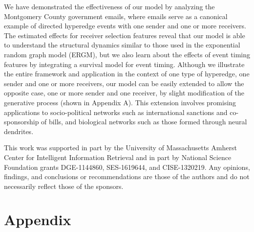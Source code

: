 \documentclass[ba]{imsart}
\numberwithin{equation}{section}
\theoremstyle{plain}
\begin{document}
	We have demonstrated the effectiveness of our model by analyzing the Montgomery County government emails, where emails serve as a canonical example of directed hyperedge events with one sender and one or more receivers. The estimated effects for receiver selection features reveal that our model is able to understand the structural dynamics similar to those used in the exponential random graph model (ERGM), but we also learn about the effects of event timing features by integrating a survival model for event timing. Although we illustrate the entire framework and application in the context of one type of hyperedge, one sender and one or more receivers, our model can be easily extended to allow the opposite case, one or more sender and one receiver, by slight modification of the generative process (shown in Appendix A). This extension involves promising applications to socio-political networks such as international sanctions and co-sponsorship of bills, and biological networks such as those formed through neural dendrites. %
	
	\begin{acknowledgement}
		This work was supported in part by the University of Massachusetts Amherst Center for Intelligent Information Retrieval and in part by National Science Foundation grants DGE-1144860, SES-1619644, and CISE-1320219. Any opinions, findings, and conclusions or recommendations are those of the authors and do not necessarily reflect those of the
		sponsors.
	\end{acknowledgement}
	
	\section*{Appendix}
\end{document}
